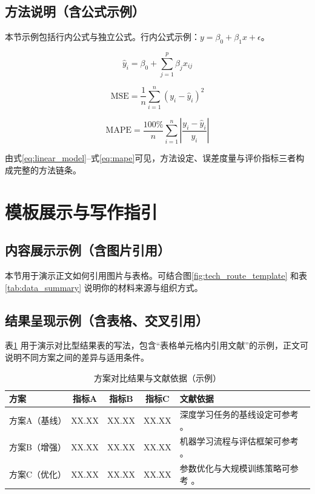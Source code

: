 \documentclass[UTF8,AutoFakeBold=1,AutoFakeSlant,zihao=-4]{SCAU}
\begin{document}
\subsection{方法说明（含公式示例）}
本节示例包括行内公式与独立公式。行内公式示例：$y=\beta_0+\beta_1 x+\epsilon$。

\begin{equation}
  \hat{y}_i = \beta_0 + \sum_{j=1}^{p}\beta_j x_{ij}
  \label{eq:linear_model}
\end{equation}

\begin{equation}
  \mathrm{MSE} = \frac{1}{n}\sum_{i=1}^{n}(y_i-\hat{y}_i)^2
  \label{eq:mse}
\end{equation}

\begin{equation}
  \mathrm{MAPE} = \frac{100\%}{n}\sum_{i=1}^{n}\left|\frac{y_i-\hat{y}_i}{y_i}\right|
  \label{eq:mape}
\end{equation}

由式\ref{eq:linear_model}--式\ref{eq:mape}可见，方法设定、误差度量与评价指标三者构成完整的方法链条。

\section{模板展示与写作指引}

\subsection{内容展示示例（含图片引用）}
本节用于演示正文如何引用图片与表格。可结合图\ref{fig:tech_route_template} 和表\ref{tab:data_summary} 说明你的材料来源与组织方式。

\subsection{结果呈现示例（含表格、交叉引用）}
表\ref{tab:scheme_metrics} 用于演示对比型结果表的写法，包含“表格单元格内引用文献”的示例，正文可说明不同方案之间的差异与适用条件。

\begin{table}[htbp]
  \centering
  \caption{方案对比结果与文献依据（示例）}
  \label{tab:scheme_metrics}
  \begin{tabular}{p{2.2cm}ccc p{4.2cm}}
    \toprule
    方案 & 指标A & 指标B & 指标C & 文献依据 \\
    \midrule
    方案A（基线） & XX.XX & XX.XX & XX.XX & 深度学习任务的基线设定可参考 \cite{smith2022deep}。 \\
    方案B（增强） & XX.XX & XX.XX & XX.XX & 机器学习流程与评估框架可参考 \cite{wilson2021machine}。 \\
    方案C（优化） & XX.XX & XX.XX & XX.XX & 参数优化与大规模训练策略可参考 \cite{chen2023neural}。 \\
    \bottomrule
  \end{tabular}
\end{table}
\end{document}
